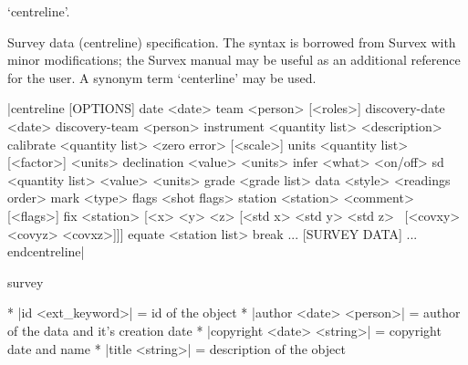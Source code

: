 \subsubchapter `centreline'.

\description
  Survey data (centreline) specification. The syntax is borrowed from Survex 
  with minor modifications; the Survex manual may be useful as an additional
  reference for the user. A synonym term `centerline' may be used.
\enddescription

\syntax
      |centreline [OPTIONS]
          date <date>
          team <person> [<roles>]
          discovery-date <date>
          discovery-team <person>
          instrument <quantity list> <description>
          calibrate <quantity list> <zero error> [<scale>]
          units <quantity list> [<factor>] <units>
          declination <value> <units>
          infer <what> <on/off>
          sd <quantity list> <value> <units>
          grade <grade list>
          data <style> <readings order>
          mark <type>
          flags <shot flags>
          station <station> <comment> [<flags>]
          fix <station> [<x> <y> <z> [<std x> <std y> <std z> \
            [<covxy> <covyz> <covxz>]]]
          equate <station list>
          break
          ...
          [SURVEY DATA]
          ...
        endcentreline|
\endsyntax

\context
  survey
\endcontext

\options
  * |id <ext_keyword>| = id of the object
  * |author <date> <person>| = author of the data and it's creation date
  * |copyright <date> <string>| = copyright date and name
  * |title <string>| = description of the object
\endoptions


